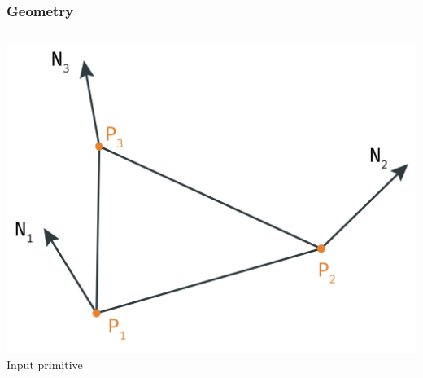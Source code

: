 	\begin{frame}\frametitle{Geometry}
		\begin{columns}
			\begin{column}{0.6\textwidth}
				\begin{center}
					\includegraphics[width=\textwidth]{img/1_single/inputPrimitive_emphGeometry.png}
					\small{Input primitive}
				\end{center}
			\end{column}
		\end{columns}
	\end{frame}

